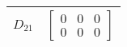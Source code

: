\begin{tabular}{cl}
 $D_{21}$ & $\left[\begin{matrix}0 & 0 & 0\\0 & 0 & 0\end{matrix}\right]$                                                                                                                                                                                                                                                                                                                                                                                                                                                                                                                                                                                                                                                                                                                                                                                                                                                                                                                                                                                                                                                                        \\
\hline
\end{tabular}